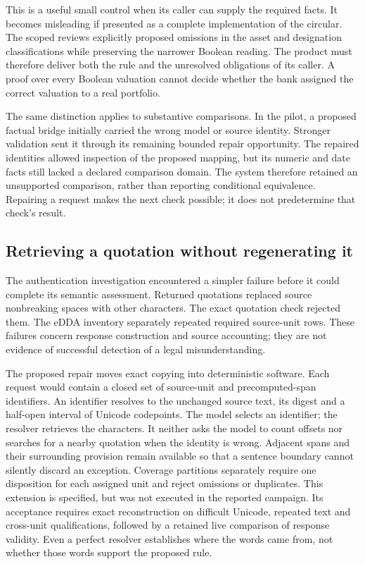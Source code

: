 \documentclass[12pt,a4paper,oneside,openany]{book}
\begin{document}
This is a useful small control when its caller can supply the required facts.
It becomes misleading if presented as a complete implementation of the
circular. The scoped reviews explicitly proposed omissions in the asset and
designation classifications while preserving the narrower Boolean reading.
The product must therefore deliver both the rule and the unresolved obligations
of its caller. A proof over every Boolean valuation cannot decide whether the
bank assigned the correct valuation to a real portfolio.

The same distinction applies to substantive comparisons. In the pilot, a
proposed factual bridge initially carried the wrong model or source identity.
Stronger validation sent it through its remaining bounded repair opportunity.
The repaired identities allowed inspection of the proposed mapping, but its
numeric and date facts still lacked a declared comparison domain. The system
therefore retained an unsupported comparison, rather than reporting conditional
equivalence. Repairing a request makes the next check possible; it does not
predetermine that check's result.

\subsection{Retrieving a quotation without regenerating it}

The authentication investigation encountered a simpler failure before it could
complete its semantic assessment. Returned quotations replaced source
nonbreaking spaces with other characters. The exact quotation check rejected
them. The eDDA inventory separately repeated required source-unit rows. These
failures concern response construction and source accounting; they are not
evidence of successful detection of a legal misunderstanding.

The proposed repair moves exact copying into deterministic software. Each
request would contain a closed set of source-unit and precomputed-span
identifiers. An identifier resolves to the unchanged source text, its digest
and a half-open interval of Unicode codepoints. The model selects an identifier;
the resolver retrieves the characters. It neither asks the model to count
offsets nor searches for a nearby quotation when the identity is wrong.
Adjacent spans and their surrounding provision remain available so that a
sentence boundary cannot silently discard an exception. Coverage partitions
separately require one disposition for each assigned unit and reject omissions
or duplicates. This extension is specified, but was not executed in the
reported campaign. Its acceptance requires exact reconstruction on difficult
Unicode, repeated text and cross-unit qualifications, followed by a retained
live comparison of response validity. Even a perfect resolver establishes
where the words came from, not whether those words support the proposed rule.
\end{document}
